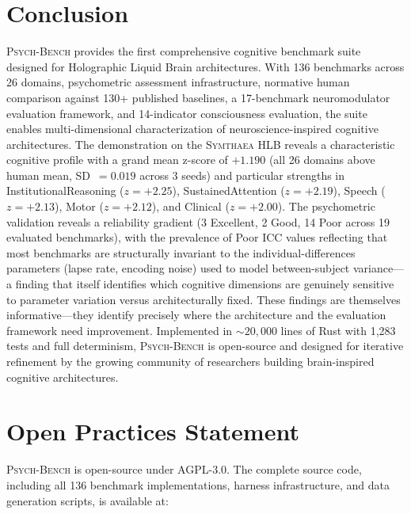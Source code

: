 \documentclass[11pt,letterpaper]{article}
\newcommand{\symthaea}{\textsc{Symthaea}}
\newcommand{\psychbench}{\textsc{Psych-Bench}}
\newcommand{\hlb}{\textsc{HLB}}
\begin{document}
\section{Conclusion}
\label{sec:conclusion}

\psychbench{} provides the first comprehensive cognitive benchmark suite designed for Holographic Liquid Brain architectures. With 136 benchmarks across 26 domains, psychometric assessment infrastructure, normative human comparison against 130+ published baselines, a 17-benchmark neuromodulator evaluation framework, and 14-indicator consciousness evaluation, the suite enables multi-dimensional characterization of neuroscience-inspired cognitive architectures. The demonstration on the \symthaea{} \hlb{} reveals a characteristic cognitive profile with a grand mean z-score of $+1.190$ (all 26 domains above human mean, SD~$= 0.019$ across 3 seeds) and particular strengths in InstitutionalReasoning ($z = +2.25$), SustainedAttention ($z = +2.19$), Speech ($z = +2.13$), Motor ($z = +2.12$), and Clinical ($z = +2.00$). The psychometric validation reveals a reliability gradient (3 Excellent, 2 Good, 14 Poor across 19 evaluated benchmarks), with the prevalence of Poor ICC values reflecting that most benchmarks are structurally invariant to the individual-differences parameters (lapse rate, encoding noise) used to model between-subject variance---a finding that itself identifies which cognitive dimensions are genuinely sensitive to parameter variation versus architecturally fixed. These findings are themselves informative---they identify precisely where the architecture and the evaluation framework need improvement. Implemented in ${\sim}20{,}000$ lines of Rust with 1,283 tests and full determinism, \psychbench{} is open-source and designed for iterative refinement by the growing community of researchers building brain-inspired cognitive architectures.

\section*{Open Practices Statement}

\psychbench{} is open-source under AGPL-3.0. The complete source code, including all 136 benchmark implementations, harness infrastructure, and data generation scripts, is available at:
\end{document}
